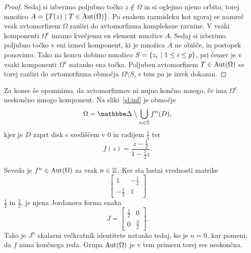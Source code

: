 \begin{proof}


Sedaj si izberimo poljubno točko $z \not \in \Omega$ in si oglejmo
njeno orbito, torej množico $A = \left\{T(z)~\middle\vert~T \in \operatorname{Aut}(\Omega)\right\}$.
Po enakem razmisleku kot zgoraj se namreč vsak avtomorfizem
$\Omega$ razširi do avtomorfizma kompleksne ravnine. V vsaki
komponenti $\Omega^\mathsf{c}$ imamo kvečjemu en element množice
$A$. Sedaj si izberimo poljubno točko v eni izmed komponent, ki je
množica $A$ ne obišče, in postopek ponovimo. Tako na koncu dobimo
množico $S = \left\{z_i~\middle\vert~1 \leq i \leq p\right\}$, pri čemer je v vsaki
komponenti $\Omega^\mathsf{c}$ natanko ena točka. Poljuben
avtomorfizem $T \in \operatorname{Aut}(\Omega)$ se torej razširi do avtomorfizma
območja $\Omega \setminus S$, s tem pa je izrek dokazan.
\end{proof}

Za konec še opomnimo, da avtomorfizmov ni nujno končno mnogo, če
ima $\Omega^\mathsf{c}$ neskončno mnogo komponent. Na
sliki~\ref{sl:inf} je območje
\[
\Omega = \dsk \bigsetminus \bigcup_{n \in \Z} f^n(D),
\]
kjer je $D$ zaprt disk s središčem v $0$ in radijem $\frac{1}{5}$
ter
\[
f(z) = \frac{z - \frac{1}{2}}{1 - \frac{1}{2} z}.
\]



Seveda je $f^n \in \operatorname{Aut}(\Omega)$ za vsak $n \in \mathbb{Z}$. Ker sta lastni
vrednosti matrike
\[
\begin{bmatrix}
      1      & -\frac{1}{2} \\
-\frac{1}{2} &       1
\end{bmatrix}
\]
$\frac{1}{2}$ in $\frac{3}{2}$, je njena Jordanova forma enaka
\[
J =
\begin{bmatrix}
\frac{1}{2} &      0      \\
     0      & \frac{3}{2}
\end{bmatrix}.
\]
Tako je $J^n$ skalarni večkratnik identitete natanko tedaj, ko je
$n = 0$, kar pomeni, da $f$ nima končnega reda. Grupa
$\operatorname{Aut}(\Omega)$ je v tem primeru torej res neskončna.
